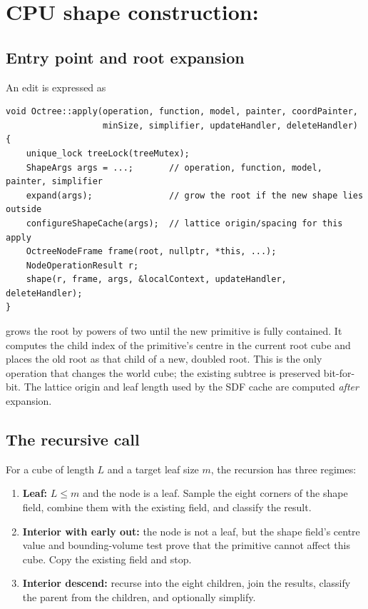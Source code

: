 \section{CPU shape construction: }
\label{sec:cpushape}

\subsection{Entry point and root expansion}

An edit is expressed as
\begin{lstlisting}[caption={The public shape entry point (simplified).},label={lst:apply}]
void Octree::apply(operation, function, model, painter, coordPainter,
                   minSize, simplifier, updateHandler, deleteHandler) {
    unique_lock treeLock(treeMutex);
    ShapeArgs args = ...;       // operation, function, model, painter, simplifier
    expand(args);               // grow the root if the new shape lies outside
    configureShapeCache(args);  // lattice origin/spacing for this apply
    OctreeNodeFrame frame(root, nullptr, *this, ...);
    NodeOperationResult r;
    shape(r, frame, args, &localContext, updateHandler, deleteHandler);
}
\end{lstlisting}

 grows the root by powers of two until the new primitive is
fully contained.  It computes the child index of the primitive's centre in
the current root cube and places the old root as that child of a new,
doubled root.  This is the only operation that changes the world cube; the
existing subtree is preserved bit-for-bit.  The lattice origin and leaf
length used by the SDF cache are computed \emph{after} expansion.

\subsection{The recursive  call}

For a cube of length $L$ and a target leaf size $m$, the recursion has
three regimes:
\begin{enumerate}
\item \textbf{Leaf:} $L\le m$ and the node is a leaf.  Sample the eight
  corners of the shape field, combine them with the existing field, and
  classify the result.
\item \textbf{Interior with early out:} the node is not a leaf, but the
  shape field's centre value and bounding-volume test prove that the
  primitive cannot affect this cube.  Copy the existing field and stop.
\item \textbf{Interior descend:} recurse into the eight children, join the
  results, classify the parent from the children, and optionally simplify.
\end{enumerate}

